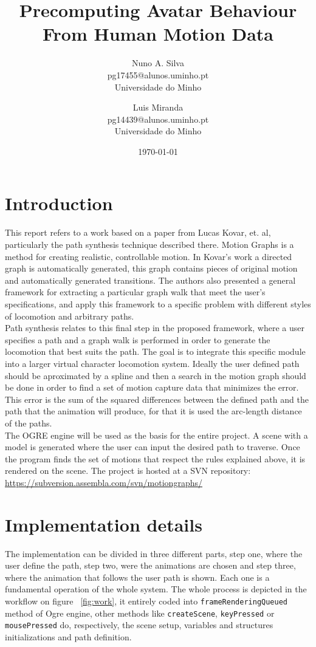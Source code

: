 \documentclass[a4paper]{article}
\title{Precomputing Avatar Behaviour From Human Motion Data}
\date{\today}
\author{
Nuno A. Silva\\ \small pg17455@alunos.uminho.pt \\ Universidade do Minho
\and
Luis Miranda\\ \small pg14439@alunos.uminho.pt \\ Universidade do Minho
}
\begin{document}
\maketitle



\section{Introduction}
This report refers to a work based on a paper from Lucas Kovar, et. al\cite{motiongraphs}, particularly the path synthesis technique described there. Motion Graphs is a method for creating realistic, controllable motion. In Kovar's work a directed graph is automatically generated, this graph contains pieces of original motion and automatically generated transitions. The authors also presented a general framework for extracting a particular graph walk that meet the user's specifications, and apply this framework to a specific problem with different styles of locomotion and arbitrary paths. \\

Path synthesis relates to this final step in the proposed framework, where a user specifies a path and a graph walk is performed in order to generate the locomotion that best suits the path. The goal is to integrate this specific module into a larger virtual character locomotion system. Ideally the user defined path should be aproximated by a spline and then a search in the motion graph should be done in order to find a set of motion capture data that minimizes the error. This error is the sum of the squared differences between the defined path and the path that the animation will produce, for that it is used the arc-length distance of the paths. \\

The OGRE engine will be used as the basis for the entire project. A scene with a model is generated where the user can input the desired path to traverse. Once the program finds the set of motions that respect the rules explained above, it is rendered on the scene. The project is hosted at a SVN repository: \url{https://subversion.assembla.com/svn/motiongraphs/} \\



\section{Implementation details}
The implementation can be divided in three  different parts, step one, where the user define the path, step two, were the animations are chosen and step three, where the animation that follows the user path is shown. Each one is a fundamental operation of the whole system. The whole process is depicted in the workflow on figure ~\ref{fig:work}, it entirely coded into \texttt{frameRenderingQueued} method of Ogre engine, other methods like \texttt{createScene}, \texttt{keyPressed} or \texttt{mousePressed} do, respectively, the scene setup, variables and structures initializations and path definition. \\
\end{document}

